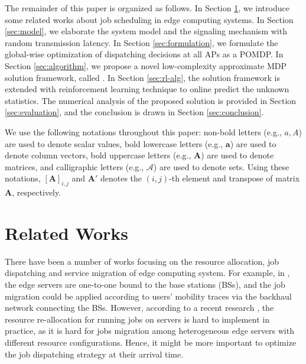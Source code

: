 The remainder of this paper is organized as follows.
In Section \ref{sec:review}, we introduce some related works about job scheduling in edge computing systems.
In Section \ref{sec:model}, we elaborate the system model and the signaling mechanism with random transmission latency.
In Section \ref{sec:formulation}, we formulate the global-wise optimization of dispatching decisions at all APs as a POMDP.
In Section \ref{sec:algorithm}, we propose a novel low-complexity approximate MDP solution framework, called \algname.
In Section \ref{sec:rl-alg}, the solution framework is extended with reinforcement learning technique to online predict the unknown statistics.
The numerical analysis of the proposed solution is provided in Section \ref{sec:evaluation}, and the conclusion is drawn in Section \ref{sec:conclusion}.

We use the following notations throughout this paper: 
non-bold letters (e.g., $a, A$) are used to denote scalar values,
bold lowercase letters (e.g., $\mathbf{a}$) are used to denote column vectors,
bold uppercase letters (e.g., $\mathbf{A}$) are used to denote matrices,
and calligraphic letters (e.g., $\mathcal{A}$) are used to denote sets.
Using these notations, $[\mathbf{A}]_{i,j}$ and $\mathbf{A}'$ denotes the $(i,j)$-th element and transpose of matrix $\mathbf{A}$, respectively.

\section{Related Works}
\label{sec:review}
{
    There have been a number of works focusing on the resource allocation, job dispatching and service migration of edge computing system.
    For example, in \cite{TON19-WangSq}, the edge servers are one-to-one bound to the base stations (BSs), and the job migration could be applied according to users' mobility traces via the backhaul network connecting the BSs.
    However, according to a recent research \cite{INFOCOM19-WuC}, the resource re-allocation for running jobs on servers is hard to implement in practice, as it is hard for jobs migration among heterogeneous edge servers with different resource configurations.
    Hence, it might be more important to optimize the job dispatching strategy at their arrival time.
}

